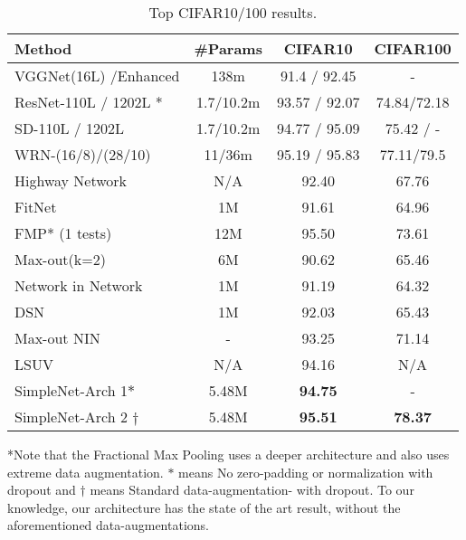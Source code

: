 \documentclass{article} \usepackage{lets_keepit_simple,times}
\begin{document}
\begin{table}[H]
\centering
\caption{Top CIFAR10/100 results.}
\label{tab:cifar}
\begin{tabular}{lccc}
\textbf{Method}  & \textbf{\#Params}   & \textbf{CIFAR10}       & \textbf{CIFAR100}      \\ \hline
VGGNet(16L) \cite{Sergey_CIFAR10_OnTorch_2015}/Enhanced  & 138m   & 91.4 / 92.45  & -             \\ ResNet-110L / 1202L \cite{He_ResNet_2015} *   & 1.7/10.2m & 93.57 / 92.07 & 74.84/72.18 \\ SD-110L / 1202L \cite{Huang_DeepNN_StochDepth_2016} & 1.7/10.2m & 94.77 / 95.09 & 75.42 / -     \\ WRN-(16/8)/(28/10) \cite{Zagoruyko_WRN_2016} & 11/36m    & 95.19 / 95.83 & 77.11/79.5  \\ Highway Network \cite{Srivastava_HighwayNets_2015}  & N/A   & 92.40  & 67.76    \\ FitNet \cite{Romero_Fitnet_2014}   & 1M  & 91.61  & 64.96   \\ FMP* (1 tests) \cite{Graham_FractionalMaxpooling_2014}     & 12M    & 95.50   & 73.61         \\ Max-out(k=2) \cite{Goodfellow_MaxoutNetwork_2013}    & 6M  & 90.62   & 65.46         \\ Network in Network \cite{Lin_NIN_2013}   & 1M   & 91.19    & 64.32   \\ DSN \cite{Lee_DeeplySupervisedNet_2015}   & 1M   & 92.03   & 65.43         \\ Max-out NIN \cite{JiaRen_BatchNormMaxoutNIN_2015}    & -     & 93.25         & 71.14         \\ LSUV \cite{Mishkin_AllYouNeedIsGoodInit_2016}    & N/A    & 94.16    & N/A     \\ SimpleNet-Arch 1$*$       & 5.48M      & \textbf{94.75}   & -         \\ 
SimpleNet-Arch 2 $\dagger$     & 5.48M      & \textbf{95.51}   & \textbf{78.37}         \\ \hline
\end{tabular}
\end{table}

*Note that the Fractional Max Pooling \cite{Graham_FractionalMaxpooling_2014} uses a deeper architecture and also uses extreme data augmentation. $*$  means No zero-padding or normalization with dropout and $\dagger$ means Standard data-augmentation- with dropout. To our knowledge, our architecture has the state of the art result, without the aforementioned data-augmentations.
\end{document}
